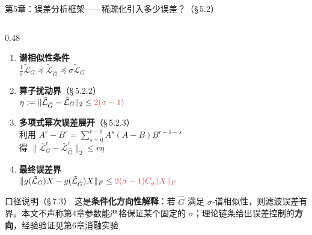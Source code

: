 \documentclass[aspectratio=169,9pt,xcolor=dvipsnames]{beamer}
\begin{document}
\begin{frame}{第5章：误差分析框架——稀疏化引入多少误差？（§\,5.2）}
\begin{columns}[T]
\begin{column}{0.48\textwidth}
  \vspace{0.1cm}
  \begin{enumerate}\setlength{\itemsep}{8pt}
    \item \textbf{谱相似性条件}\\
      $\frac{1}{\sigma}\tilde{\mathcal{L}}_G\preceq\tilde{\mathcal{L}}_{\hat{G}}\preceq\sigma\tilde{\mathcal{L}}_G$
    \item \textbf{算子扰动界}（§\,5.2.2）\\
      $\eta:=\|\tilde{\mathcal{L}}_{\hat{G}}-\tilde{\mathcal{L}}_G\|_2\le{\color{myred}2(\sigma-1)}$
    \item \textbf{多项式幂次误差展开}（§\,5.2.3）\\
      利用 $A^r-B^r=\sum_{s=0}^{r-1}A^s(A-B)B^{r-1-s}$\\
      得 $\|\bar{\mathcal{L}}_G^r-\bar{\mathcal{L}}_{\hat{G}}^r\|_2\le r\eta$
    \item \textbf{最终误差界}\\
      $\|g(\tilde{\mathcal{L}}_G)X-g(\tilde{\mathcal{L}}_{\hat{G}})X\|_F\le{\color{myred}2(\sigma-1)C_g\|X\|_F}$
  \end{enumerate}

  \vspace{0.2cm}
  \begin{alertblock}{口径说明（§\,7.3）}
    \small 这是\textbf{条件化方向性解释}：若 $\hat{G}$ 满足 $\sigma$-谱相似性，则滤波误差有界。本文不声称第4章参数能严格保证某个固定的 $\sigma$；理论链条给出误差控制的\textbf{方向}，经验验证见第6章消融实验
  \end{alertblock}
\end{column}
\end{columns}
\end{frame}
\end{document}
